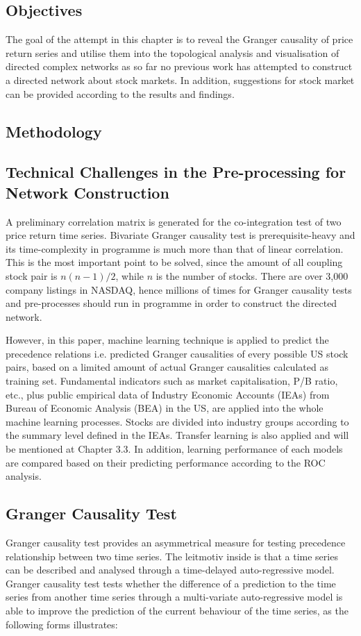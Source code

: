 \subsection{Objectives}
The goal of the attempt in this chapter is to reveal the Granger causality of price return series and utilise them into the topological analysis and visualisation of directed complex networks as so far no previous work has attempted to construct a directed network about stock markets. In addition, suggestions for stock market can be provided according to the results and findings.

\subsection{Methodology}
\subsection{Technical Challenges in the Pre-processing for Network Construction}
A preliminary correlation matrix is generated for the co-integration test of two price return time series. Bivariate Granger causality test is prerequisite-heavy and its time-complexity in programme is much more than that of linear correlation. This is the most important point to be solved, since the amount of all coupling stock pair is $n(n-1)/2$, while $n$ is the number of stocks. There are over 3,000 company listings in NASDAQ, hence millions of times for Granger causality tests and pre-processes should run in programme in order to construct the directed network.

However, in this paper, machine learning technique is applied to predict the precedence relations i.e. predicted Granger causalities of every possible US stock pairs, based on a limited amount of actual Granger causalities calculated as training set. Fundamental indicators such as market capitalisation, P/B ratio, etc., plus public empirical data of Industry Economic Accounts (IEAs) from Bureau of Economic Analysis (BEA) \cite{beawebsite} in the US, are applied into the whole machine learning processes. Stocks are divided into industry groups according to the summary level defined in the IEAs. Transfer learning is also applied and will be mentioned at Chapter 3.3.  In addition, learning performance of each models are compared based on their predicting performance according to the ROC analysis.

\subsection{Granger Causality Test}
Granger causality test \cite{granger} provides an asymmetrical measure for testing precedence relationship between two time series. The leitmotiv inside is that a time series can be described and analysed through a time-delayed auto-regressive model. Granger causality test tests whether the difference of a prediction to the time series from another time series through a multi-variate auto-regressive model is able to improve the prediction of the current behaviour of the time series, as the following forms illustrates:

